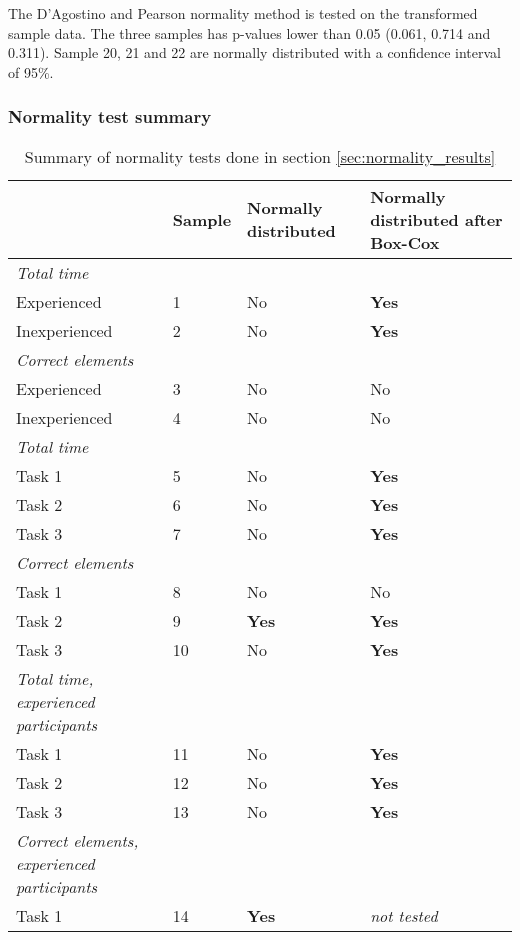 The D'Agostino and Pearson normality method is tested on the transformed sample data. The three samples has p-values lower than 0.05 (0.061, 0.714 and 0.311). Sample 20, 21 and 22 are normally distributed with a confidence interval of 95\%. 

\subsubsection{Normality test summary}\label{sec:normaltest_summary}

	\begin{longtable}{p{}|l|p{2cm}|p{}}
	\caption[Summary, normality tests]{Summary of normality tests done in section \ref{sec:normality_results}} \label{tab:normaltest_summary} \\
		  & Sample & Normally distributed  & Normally distributed after Box-Cox  \\ \hline
		\textit{Total time} & & & \\
		Experienced & 1 &No   & \textbf{Yes}   \\
		Inexperienced  & 2 & No & \textbf{Yes}     \\ \hline
		\textit{Correct elements} & & & \\
		Experienced & 3 & No  & No   \\
		Inexperienced  & 4 & No & No   \\ \hline
		\textit{Total time }& & & \\
		Task 1 & 5 &No  & \textbf{Yes}  \\
		Task 2 & 6 &No  & \textbf{Yes}   \\
		Task 3 & 7 & No & \textbf{Yes}  \\ \hline
		\textit{Correct elements} & & & \\
		Task 1 & 8 & No  & No  \\
		Task 2 & 9 &\textbf{Yes}  & \textbf{Yes}   \\
		Task 3 & 10 & No & \textbf{Yes}  \\ \hline
		\textit{Total time, experienced participants} & & & \\
		Task 1 & 11 & No  & \textbf{Yes}  \\
		Task 2 & 12 & No  & \textbf{Yes}   \\
		Task 3 & 13 & No & \textbf{Yes}  \\ \hline
		\textit{Correct elements, experienced participants} & & & \\
		Task 1 & 14 & \textbf{Yes}  & \textit{not tested} \\

\end{longtable}
